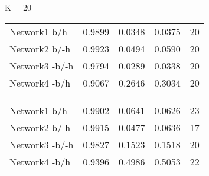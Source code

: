 \begin{table*}[h]

	\begin{minipage}[h]{0.45\linewidth} 
K = 20
\begin{tabular}{lrrrr}

 Network1 b/h          &   0.9899 &      0.0348 &   0.0375 & 20 \\
 Network2 b/-h       &   0.9923 &      0.0494 &   0.0590 & 20 \\
 Network3 -b/-h      &   0.9794 &      0.0289 &   0.0338 & 20 \\
 Network4 -b/h        &   0.9067 &      0.2646 &   0.3034 & 20 \\
\hline
\end{tabular}
\end{minipage}
\hspace{0.8cm}
\begin{minipage}[h]{0.45\linewidth}
\begin{tabular}{lrrrr}
Network1 b/h       &   0.9902 &      0.0641 &   0.0626 &  23 \\
Network2 b/-h     &   0.9915 &      0.0477 &   0.0636 & 17 \\
Network3 -b/-h     &   0.9827 &      0.1523 &   0.1518 &  20 \\
Network4 -b/h     &   0.9396 &      0.4986 &   0.5053 &  22 \\
\hline
\end{tabular}
\end{minipage}
\end{table*}






